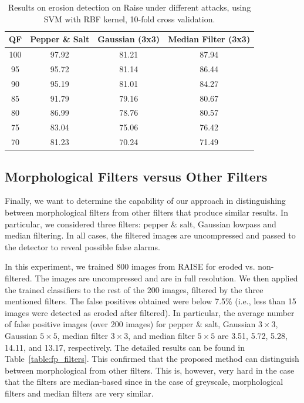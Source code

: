 \documentclass[review]{elsarticle}
\begin{document}
\begin{table}[t!]
	\centering
	\caption{Results on erosion detection on Raise under different attacks, using SVM with RBF kernel, 10-fold cross validation.}
	\label{table:attacks2}
	\begin{tabular}{c|ccc}
		\hline\hline
		\textbf{QF} & \textbf{Pepper \& Salt}&\textbf{Gaussian (3x3)}&\textbf{Median Filter (3x3)}\\
		\hline
		100&97.92&81.21&87.94\\
		95&95.72&81.14&86.44\\
		90&95.19&81.01&84.27\\
		85&91.79&79.16&80.67\\
		80&86.99&78.76&80.57\\
		75&83.04&75.06&76.42\\
		70&81.23&70.24&71.49\\
		\hline\hline	
	\end{tabular}
\end{table}

\subsection{Morphological Filters versus Other Filters }
\label{subsec:results_different_filters}

Finally, we want to determine the capability of our approach in distinguishing between morphological filters from other filters that produce similar results. In particular, we considered three filters: pepper \& salt, Gaussian lowpass and median filtering. In all cases, the filtered images are uncompressed and passed to the detector to reveal possible false alarms. 

In this experiment, we trained 800 images from RAISE for eroded vs. non-filtered. The images are uncompressed and are in full resolution. We then applied the trained classifiers to the rest of the 200 images, filtered by the three mentioned filters. The false positives obtained were below 7.5\% (i.e., less than 15 images were detected as eroded after filtered). In particular, the average number of false positive images (over 200 images) for pepper \& salt, Gaussian $3 \times 3$, Gaussian $5 \times 5$, median filter $3 \times 3$, and median filter $5 \times 5$ are 3.51, 5.72, 5.28, 14.11, and 13.17, respectively. The detailed results can be found in Table~\ref{table:fp_filters}. This confirmed that the proposed method can distinguish between morphological from other filters. This is, however, very hard in the case that the filters are median-based since in the case of greyscale, morphological filters and median filters are very similar.
\end{document}
